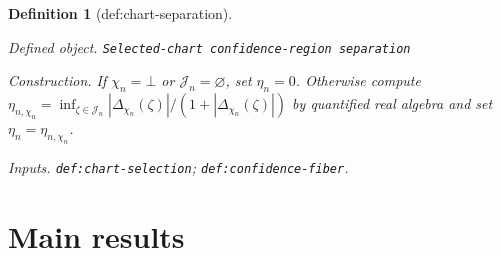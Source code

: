 \documentclass{article}
\newtheorem{definition}{Definition}
\begin{document}
\begin{definition}[def:chart-separation]\label{def:chart-separation}
\par\smallskip\noindent\emph{Defined object.} \texttt{Selected-\allowbreak{}chart confidence-\allowbreak{}region separation}
\par\smallskip\noindent\emph{Construction.} If \(\chi_n=\bot\) or \(\mathcal J_n=\varnothing\), set \(\eta_n=0\). Otherwise compute \(\eta_{n,\chi_n}=\inf_{\zeta\in\mathcal J_n}|\Delta_{\chi_n}(\zeta)|/(1+|\Delta_{\chi_n}(\zeta)|)\) by quantified real algebra and set \(\eta_n=\eta_{n,\chi_n}\).
\par\smallskip\noindent\emph{Inputs.} \texttt{def:\allowbreak{}chart-\allowbreak{}selection}; \texttt{def:\allowbreak{}confidence-\allowbreak{}fiber}.
\end{definition}

\section{Main results}
\end{document}
